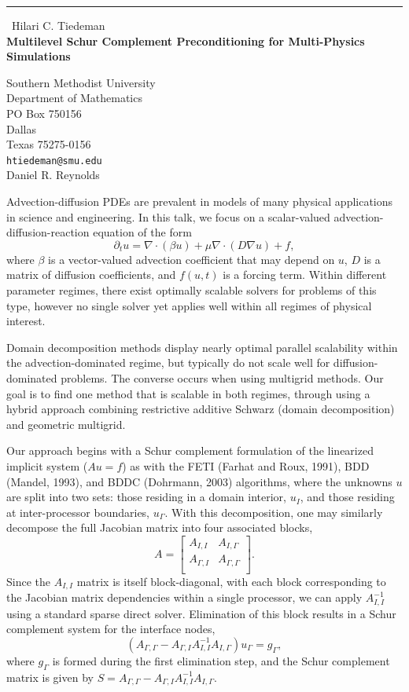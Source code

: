 \documentclass{report}
\begin{document}
\begin{center}
\rule{6in}{1pt} \
{\large Hilari C. Tiedeman \\
{\bf Multilevel Schur Complement Preconditioning for Multi-Physics Simulations}}

Southern Methodist University \\ Department of Mathematics \\ PO Box 750156 \\ Dallas \\ Texas 75275-0156
\\
{\tt htiedeman@smu.edu}\\
Daniel R. Reynolds\end{center}

Advection-diffusion PDEs are prevalent in models of many physical
applications in science and engineering. In this talk, we focus on a
scalar-valued advection-diffusion-reaction equation of the form
\[
\partial_t u = \nabla\cdot(\beta u)+\mu\nabla\cdot(D\nabla u)+f,
\]
where $\beta$ is a vector-valued advection coefficient that may
depend on $u$, $D$ is a matrix of diffusion coefficients, and
$f(u,t)$ is a forcing term. Within different parameter regimes, there
exist optimally scalable solvers for problems of this type, however no
single solver yet applies well within all regimes of physical interest.

Domain decomposition methods display nearly optimal parallel
scalability within the advection-dominated regime, but typically do
not scale well for diffusion-dominated problems. The converse occurs
when using multigrid methods. Our goal is to find one method that is
scalable in both regimes, through using a hybrid approach combining
restrictive additive Schwarz (domain decomposition) and geometric
multigrid.

Our approach begins with a Schur complement formulation of the
linearized implicit system ($Au=f$) as with the FETI (Farhat and
Roux, 1991), BDD (Mandel, 1993), and BDDC (Dohrmann, 2003) algorithms, where the
unknowns $u$ are split into two sets: those residing in a domain
interior, $u_I$, and those residing at inter-processor boundaries,
$u_\Gamma$. With this decomposition, one may similarly decompose the
full Jacobian matrix into four associated blocks,
\[
A = \left[\begin{array}{cc}
A_{I,I} & A_{I,\Gamma} \\
A_{\Gamma,I} & A_{\Gamma,\Gamma} \\
\end{array}\right].
\]
Since the $A_{I,I}$ matrix is itself block-diagonal, with each block
corresponding to the Jacobian matrix dependencies within a single
processor, we can apply $A^{-1}_{I,I}$ using a standard sparse direct
solver. Elimination of this block results in a Schur complement system
for the interface nodes,
\[
\left(A_{\Gamma,\Gamma}-A_{\Gamma,I}A^{-1}_{I,I}A_{I,\Gamma}\right)u_\Gamma=g_\Gamma,
\]
where $g_\Gamma$ is formed during the first elimination step, and the
Schur complement matrix is given by $S =
A_{\Gamma,\Gamma}-A_{\Gamma,I}A^{-1}_{I,I}A_{I,\Gamma}$.
\end{document}
